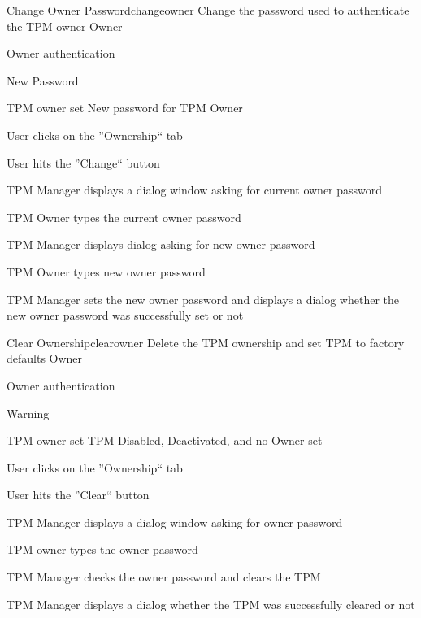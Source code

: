\documentclass[
  american        %
]{sirrixreport}
\begin{document}
\begin{usecase}{Change Owner Password}{changeowner}
\ucdesc Change the password used to authenticate the TPM owner
\ucactors Owner
\ucinclude 
   \begin{compactitem}
      \item Owner authentication 
      \item New Password 
   \end{compactitem}
\ucprecond TPM owner set
\ucpostcond New password for TPM Owner
\ucnormal 
 \item User clicks on the ''Ownership`` tab
 \item User hits the ''Change`` button
 \item TPM Manager displays a dialog window asking for current owner password
 \item TPM Owner types the current owner password
 \item TPM Manager displays dialog asking for new owner password
 \item TPM Owner types new owner password
 \item TPM Manager sets the new owner password and displays a dialog whether the new owner password was successfully set or not
\ucendflow 
\end{usecase}
\clearpage

\begin{usecase}{Clear Ownership}{clearowner}
\ucdesc Delete the TPM ownership and set TPM to factory defaults
\ucactors Owner
\ucinclude 
         \begin{compactitem}
            \item Owner authentication 
            \item Warning 
         \end{compactitem}
\ucprecond TPM owner set
\ucpostcond TPM Disabled, Deactivated, and no Owner set
\ucnormal
 \item User clicks on the ''Ownership`` tab
 \item User hits the ''Clear`` button
 \item TPM Manager displays a dialog window asking for owner password
 \item TPM owner types the owner password
 \item TPM Manager checks the owner password and clears the TPM
 \item TPM Manager displays a dialog whether the TPM was successfully cleared or not
\ucendflow 
\end{usecase}
\end{document}
